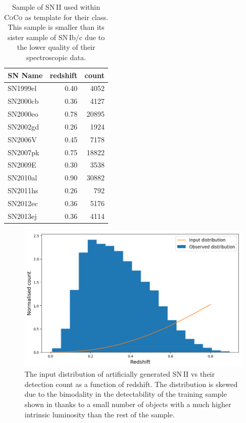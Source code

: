 \begin{table}
  \caption{Sample of SN\,II used within \textsc{CoCo} as template for their class. This sample is smaller than its sister sample of SN\,Ib/c due to the lower quality of their spectroscopic data.}
  \label{tab:SNIITemplates}
  \centering
  \begin{tabular}{l|r|r}
    SN Name  & redshift & count \\
    \hline
    SN1999el & 0.40 &  4052 \\
    SN2000cb & 0.36 &  4127 \\
    SN2000eo & 0.78 & 20895 \\
    SN2002gd & 0.26 &  1924 \\
    SN2006V  & 0.45 &  7178 \\
    SN2007pk & 0.75 & 18822 \\
    SN2009E  & 0.30 &  3538 \\
    SN2010al & 0.90 & 30882 \\
    SN2011hs & 0.26 &   792 \\
    SN2012ec & 0.36 &  5176 \\
    SN2013ej & 0.36 &  4114 \\
    \hline
  \end{tabular}
\end{table}

\begin{figure}
  \includegraphics[width=\textwidth]{Figures/Chapter5/SNII_z_dist.png}
  \caption{The input distribution of artificially generated SN\,II vs their detection count as a function of redshift. The distribution is skewed due to the bimodality in the detectability of the training sample shown in  thanks to a small number of objects with a much higher intrinsic luminosity than the rest of the sample.}
  \label{fig:IIDist}
\end{figure}

